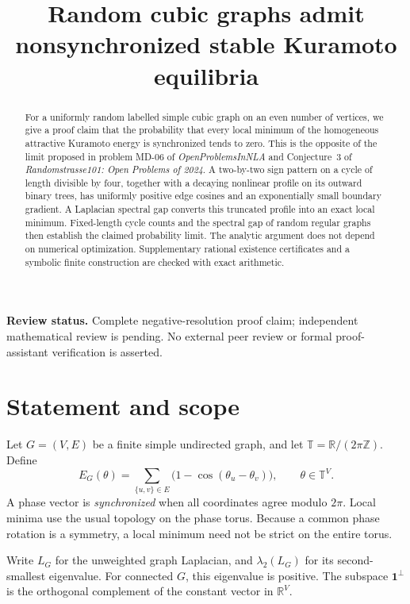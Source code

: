 \documentclass[11pt]{article}
\title{Random cubic graphs admit nonsynchronized stable Kuramoto equilibria}
\author{}
\date{}
\theoremstyle{definition}
\theoremstyle{remark}
\newcommand{\R}{\mathbb R}
\newcommand{\T}{\mathbb T}
\newcommand{\one}{\mathbf 1}
\begin{document}
\maketitle
\vspace{-2.5em}
\begin{abstract}
For a uniformly random labelled simple cubic graph on an even number of
vertices, we give a proof claim that the probability that every local minimum
of the homogeneous attractive Kuramoto energy is synchronized tends to zero.
This is the opposite of the limit proposed in problem MD-06 of
\emph{OpenProblemsInNLA} and Conjecture~3 of
\emph{Randomstrasse101: Open Problems of 2024}.
A two-by-two sign pattern on a cycle of length divisible by four, together
with a decaying nonlinear profile on its outward binary trees, has uniformly
positive edge cosines and an exponentially small boundary gradient.
A Laplacian spectral gap converts this truncated profile into an exact local
minimum. Fixed-length cycle counts and the spectral gap of random regular
graphs then establish the claimed probability limit. The analytic argument
does not depend on numerical optimization. Supplementary rational existence certificates and a symbolic finite
construction are checked with exact arithmetic.
\end{abstract}

\noindent\textbf{Review status.} Complete negative-resolution proof claim;
independent mathematical review is pending. No external peer review or formal
proof-assistant verification is asserted.

\section{Statement and scope}

Let $G=(V,E)$ be a finite simple undirected graph, and let
$\T=\R/(2\pi\mathbb Z)$. Define
\begin{equation}\label{eq:energy}
 E_G(\theta)=\sum_{\{u,v\}\in E}\bigl(1-\cos(\theta_u-\theta_v)\bigr),
 \qquad \theta\in\T^{V}.
\end{equation}
A phase vector is \emph{synchronized} when all coordinates agree modulo
$2\pi$. Local minima use the usual topology on the phase torus. Because a
common phase rotation is a symmetry, a local minimum need not be strict on
the entire torus.

Write $L_G$ for the unweighted graph Laplacian, and $\lambda_2(L_G)$ for its
second-smallest eigenvalue. For connected $G$, this eigenvalue is positive.
The subspace $\one^\perp$ is the orthogonal complement of the constant vector
in $\R^{V}$.
\end{document}
